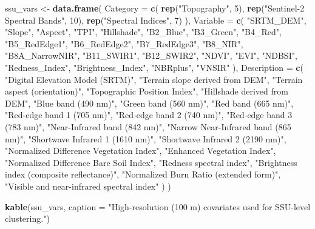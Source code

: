 \documentclass[
  10pt,
  b5paper,
  oneside]{book}
\newenvironment{Shaded}{\begin{snugshade}}{\end{snugshade}}
\newcommand{\AttributeTok}[1]{\textcolor[rgb]{0.13,0.29,0.53}{#1}}
\newcommand{\DecValTok}[1]{\textcolor[rgb]{0.00,0.00,0.81}{#1}}
\newcommand{\FunctionTok}[1]{\textcolor[rgb]{0.13,0.29,0.53}{\textbf{#1}}}
\newcommand{\NormalTok}[1]{#1}
\newcommand{\OtherTok}[1]{\textcolor[rgb]{0.56,0.35,0.01}{#1}}
\newcommand{\StringTok}[1]{\textcolor[rgb]{0.31,0.60,0.02}{#1}}
\begin{document}
\begin{Shaded}
\begin{Highlighting}[]
\NormalTok{ssu\_vars }\OtherTok{\textless{}{-}} \FunctionTok{data.frame}\NormalTok{(}
  \AttributeTok{Category =} \FunctionTok{c}\NormalTok{(}
    \FunctionTok{rep}\NormalTok{(}\StringTok{"Topography"}\NormalTok{, }\DecValTok{5}\NormalTok{),}
    \FunctionTok{rep}\NormalTok{(}\StringTok{"Sentinel{-}2 Spectral Bands"}\NormalTok{, }\DecValTok{10}\NormalTok{),}
    \FunctionTok{rep}\NormalTok{(}\StringTok{"Spectral Indices"}\NormalTok{, }\DecValTok{7}\NormalTok{)}
\NormalTok{  ),}
  \AttributeTok{Variable =} \FunctionTok{c}\NormalTok{(}
    \StringTok{"SRTM\_DEM"}\NormalTok{, }\StringTok{"Slope"}\NormalTok{, }\StringTok{"Aspect"}\NormalTok{, }\StringTok{"TPI"}\NormalTok{, }\StringTok{"Hillshade"}\NormalTok{,}
    \StringTok{"B2\_Blue"}\NormalTok{, }\StringTok{"B3\_Green"}\NormalTok{, }\StringTok{"B4\_Red"}\NormalTok{, }\StringTok{"B5\_RedEdge1"}\NormalTok{, }\StringTok{"B6\_RedEdge2"}\NormalTok{,}
    \StringTok{"B7\_RedEdge3"}\NormalTok{, }\StringTok{"B8\_NIR"}\NormalTok{, }\StringTok{"B8A\_NarrowNIR"}\NormalTok{, }\StringTok{"B11\_SWIR1"}\NormalTok{, }\StringTok{"B12\_SWIR2"}\NormalTok{,}
    \StringTok{"NDVI"}\NormalTok{, }\StringTok{"EVI"}\NormalTok{, }\StringTok{"NDBSI"}\NormalTok{, }\StringTok{"Redness\_Index"}\NormalTok{, }\StringTok{"Brightness\_Index"}\NormalTok{,}
    \StringTok{"NBRplus"}\NormalTok{, }\StringTok{"VNSIR"}
\NormalTok{  ),}
  \AttributeTok{Description =} \FunctionTok{c}\NormalTok{(}
    \StringTok{"Digital Elevation Model (SRTM)"}\NormalTok{,}
    \StringTok{"Terrain slope derived from DEM"}\NormalTok{,}
    \StringTok{"Terrain aspect (orientation)"}\NormalTok{,}
    \StringTok{"Topographic Position Index"}\NormalTok{,}
    \StringTok{"Hillshade derived from DEM"}\NormalTok{,}
    \StringTok{"Blue band (490 nm)"}\NormalTok{,}
    \StringTok{"Green band (560 nm)"}\NormalTok{,}
    \StringTok{"Red band (665 nm)"}\NormalTok{,}
    \StringTok{"Red{-}edge band 1 (705 nm)"}\NormalTok{,}
    \StringTok{"Red{-}edge band 2 (740 nm)"}\NormalTok{,}
    \StringTok{"Red{-}edge band 3 (783 nm)"}\NormalTok{,}
    \StringTok{"Near{-}Infrared band (842 nm)"}\NormalTok{,}
    \StringTok{"Narrow Near{-}Infrared band (865 nm)"}\NormalTok{,}
    \StringTok{"Shortwave Infrared 1 (1610 nm)"}\NormalTok{,}
    \StringTok{"Shortwave Infrared 2 (2190 nm)"}\NormalTok{,}
    \StringTok{"Normalized Difference Vegetation Index"}\NormalTok{,}
    \StringTok{"Enhanced Vegetation Index"}\NormalTok{,}
    \StringTok{"Normalized Difference Bare Soil Index"}\NormalTok{,}
    \StringTok{"Redness spectral index"}\NormalTok{,}
    \StringTok{"Brightness index (composite reflectance)"}\NormalTok{,}
    \StringTok{"Normalized Burn Ratio (extended form)"}\NormalTok{,}
    \StringTok{"Visible and near{-}infrared spectral index"}
\NormalTok{  )}
\NormalTok{)}

\FunctionTok{kable}\NormalTok{(ssu\_vars,}
      \AttributeTok{caption =} \StringTok{"High{-}resolution (100 m) covariates used for SSU{-}level clustering."}\NormalTok{)}
\end{Highlighting}
\end{Shaded}
\end{document}
